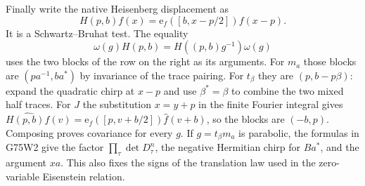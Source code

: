 Finally write the native Heisenberg displacement as
\[
 H(p,b)f(x)=\mathrm e_f([b,x-p/2])f(x-p).
\]
It is a Schwartz--Bruhat test. The equality
\[
 \omega(g) H(p,b)=H((p,b)g^{-1})\omega(g)
\]
uses the two blocks of the row on the right as its arguments.
For $m_a$ those blocks are $(pa^{-1},ba^*)$ by invariance of the
trace pairing. For $t_\beta$ they are $(p,b-p\beta)$: expand the
quadratic chirp at $x-p$ and use $\beta^*=\beta$ to combine the two
mixed half traces. For $J$ the substitution $x=y+p$ in the finite
Fourier integral gives
$\widehat{H(p,b)f}(v)=\mathrm e_f([p,v+b/2])\widehat f(v+b)$,
so the blocks are $(-b,p)$. Composing proves covariance for every
$g$. If $g=t_\beta m_a$ is parabolic, the formulas in G75W2 give
the factor $\prod_\tau\det D_\tau^n$, the negative Hermitian chirp
for $Ba^*$, and the argument $xa$. This also fixes the signs of
the translation law used in the zero-variable Eisenstein relation.
